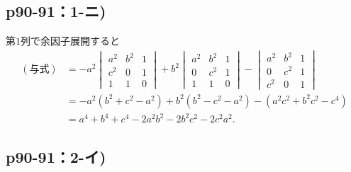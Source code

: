 \documentclass[uplatex,dvipdfmx,a4paper,11pt,fleqn]{jsarticle}
\begin{document}
    \newpage 

\subsection*{p90-91：1-ニ)}

\begin{tleftbar}
    第$1$列で余因子展開すると
    \begin{align*} 
        (\text{与式})& = -a^2\begin{vmatrix} a^2 & b^2 & 1 \\ c^2 & 0 & 1 \\ 1 & 1 & 0 \end{vmatrix}+b^2 \begin{vmatrix} a^2 & b^2 & 1 \\ 0 & c^2 & 1 \\ 1 & 1 & 0 \end{vmatrix} - \begin{vmatrix} a^2 & b^2 & 1 \\ 0 & c^2 & 1 \\ c^2 & 0 & 1 \end{vmatrix} \\
        & = -a^2 (b^2+c^2 -a^2) +b^2 (b^2-c^2-a^2)- (a^2c^2+b^2c^2-c^4) \\
        & =a^4+b^4+c^4 -2a^2b^2 - 2b^2 c^2 -2c^2 a^2 .
    \end{align*}
\end{tleftbar}
\newpage 


\subsection*{p90-91：2-イ)}
\end{document}
